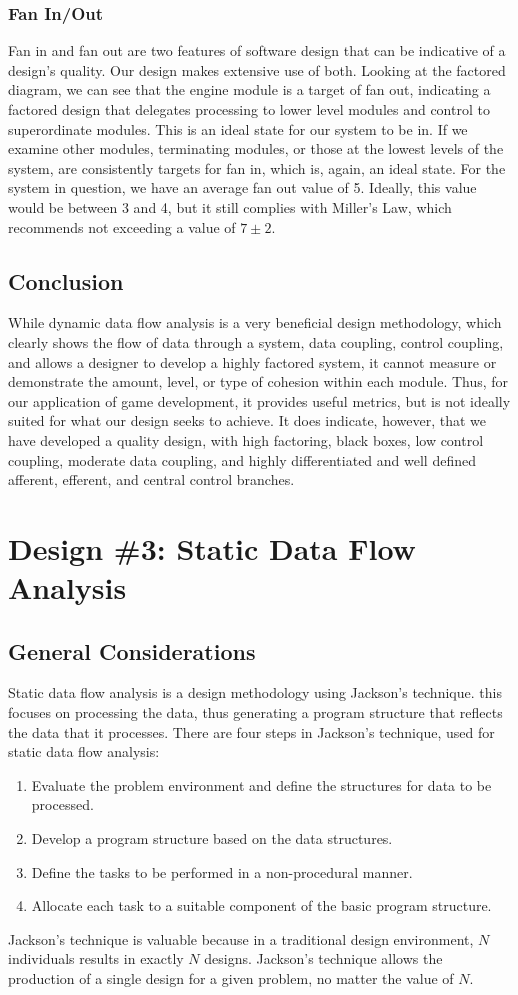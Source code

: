 \documentclass{article}
\begin{document}
		\subsubsection{Fan In/Out}
			Fan in and fan out are two features of software design that can be indicative of a design's quality. Our design makes extensive use of both. Looking at the factored diagram, we can see that the engine module is a target of fan out, indicating a factored design that delegates processing to lower level modules and control to superordinate modules. This is an ideal state for our system to be in. If we examine other modules, terminating modules, or those at the lowest levels of the system, are consistently targets for fan in, which is, again, an ideal state. For the system in question, we have an average fan out value of 5. Ideally, this value would be between 3 and 4, but it still complies with Miller's Law, which recommends not exceeding a value of $7\pm2$. 
	\subsection{Conclusion}
		While dynamic data flow analysis is a very beneficial design methodology, which clearly shows the flow of data through a system, data coupling, control coupling, and allows a designer to develop a highly factored system, it cannot measure or demonstrate the amount, level, or type of cohesion within each module. Thus, for our application of game development, it provides useful metrics, but is not ideally suited for what our design seeks to achieve. It does indicate, however, that we have developed a quality design, with high factoring, black boxes, low control coupling, moderate
data coupling, and highly differentiated and well defined afferent, efferent, and central control branches. 
%
%
\section{Design \#3: Static Data Flow Analysis}
	\subsection{General Considerations}
		Static data flow analysis is a design methodology using Jackson's technique. this focuses on processing the data, thus generating a program structure that reflects the data that it processes. There are four steps in Jackson's technique, used for static data flow analysis:
		\begin{enumerate}
			\item Evaluate the problem environment and define the structures for data to be processed. 
			\item Develop a program structure based on the data structures. 
			\item Define the tasks to be performed in a non-procedural manner. 
			\item Allocate each task to a suitable component of the basic program structure. 
		\end{enumerate}
		Jackson's technique is valuable because in a traditional design environment, $N$ individuals results in exactly $N$ designs. Jackson's technique allows the production of a single design for a given problem, no matter the value of $N$. 
\end{document}
